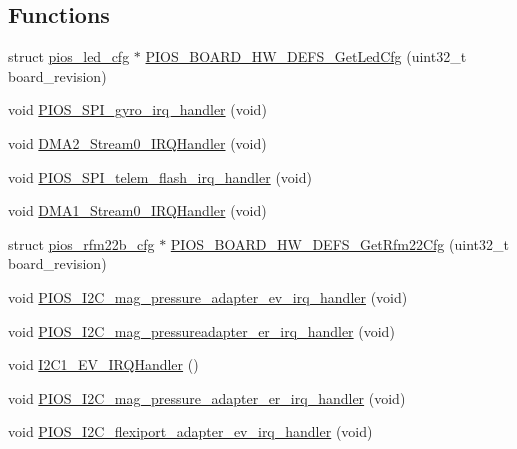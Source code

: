 \subsection*{\-Functions}
\begin{DoxyCompactItemize}
\item 
struct \hyperlink{structpios__led__cfg}{pios\-\_\-led\-\_\-cfg} $\ast$ \hyperlink{group___revo_mini_gafb76ae90816003eabf1d90feff7b1a52}{\-P\-I\-O\-S\-\_\-\-B\-O\-A\-R\-D\-\_\-\-H\-W\-\_\-\-D\-E\-F\-S\-\_\-\-Get\-Led\-Cfg} (uint32\-\_\-t board\-\_\-revision)
\item 
void \hyperlink{group___revo_mini_ga6f05a1487b9b8de794d06f0e6241e983}{\-P\-I\-O\-S\-\_\-\-S\-P\-I\-\_\-gyro\-\_\-irq\-\_\-handler} (void)
\item 
void \hyperlink{group___revo_mini_gaaf6ce196dde98712e1223b99766e06c0}{\-D\-M\-A2\-\_\-\-Stream0\-\_\-\-I\-R\-Q\-Handler} (void)
\item 
void \hyperlink{group___revo_mini_gac881c9cf27255a1660b19d2a75266b1b}{\-P\-I\-O\-S\-\_\-\-S\-P\-I\-\_\-telem\-\_\-flash\-\_\-irq\-\_\-handler} (void)
\item 
void \hyperlink{group___revo_mini_ga1b70a4441662b1d6548e803499da414f}{\-D\-M\-A1\-\_\-\-Stream0\-\_\-\-I\-R\-Q\-Handler} (void)
\item 
struct \hyperlink{structpios__rfm22b__cfg}{pios\-\_\-rfm22b\-\_\-cfg} $\ast$ \hyperlink{group___revo_mini_ga82ea8b6b6e602117e6fbadfe2d465de3}{\-P\-I\-O\-S\-\_\-\-B\-O\-A\-R\-D\-\_\-\-H\-W\-\_\-\-D\-E\-F\-S\-\_\-\-Get\-Rfm22\-Cfg} (uint32\-\_\-t board\-\_\-revision)
\item 
void \hyperlink{group___revo_mini_ga5be1ce2e09e73528c83cca2d79ac0b32}{\-P\-I\-O\-S\-\_\-\-I2\-C\-\_\-mag\-\_\-pressure\-\_\-adapter\-\_\-ev\-\_\-irq\-\_\-handler} (void)
\item 
void \hyperlink{group___revo_mini_gaa4478a056a506c7f1b70511154e01a86}{\-P\-I\-O\-S\-\_\-\-I2\-C\-\_\-mag\-\_\-pressureadapter\-\_\-er\-\_\-irq\-\_\-handler} (void)
\item 
void \hyperlink{group___revo_mini_gad0e17b57fe51ed2861178f06899345c0}{\-I2\-C1\-\_\-\-E\-V\-\_\-\-I\-R\-Q\-Handler} ()
\item 
void \hyperlink{group___revo_mini_ga2e3548269efcf5e015d952b7f69b67c1}{\-P\-I\-O\-S\-\_\-\-I2\-C\-\_\-mag\-\_\-pressure\-\_\-adapter\-\_\-er\-\_\-irq\-\_\-handler} (void)
\item 
void \hyperlink{group___revo_mini_ga0b5322143194be1bdf24d9cc88ca275e}{\-P\-I\-O\-S\-\_\-\-I2\-C\-\_\-flexiport\-\_\-adapter\-\_\-ev\-\_\-irq\-\_\-handler} (void)

\end{DoxyCompactItemize}
